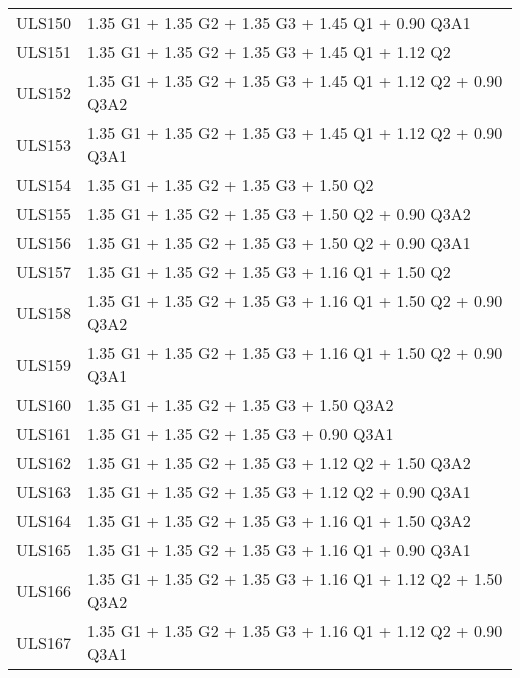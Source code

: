 \begin{center}
\begin{small}
\begin{longtable}{|l|p{10cm}|}
ULS150 & 1.35 G1 + 1.35 G2 + 1.35 G3 + 1.45 Q1 + 0.90 Q3A1\\
ULS151 & 1.35 G1 + 1.35 G2 + 1.35 G3 + 1.45 Q1 + 1.12 Q2\\
ULS152 & 1.35 G1 + 1.35 G2 + 1.35 G3 + 1.45 Q1 + 1.12 Q2 + 0.90 Q3A2\\
ULS153 & 1.35 G1 + 1.35 G2 + 1.35 G3 + 1.45 Q1 + 1.12 Q2 + 0.90 Q3A1\\
ULS154 & 1.35 G1 + 1.35 G2 + 1.35 G3 + 1.50 Q2\\
ULS155 & 1.35 G1 + 1.35 G2 + 1.35 G3 + 1.50 Q2 + 0.90 Q3A2\\
ULS156 & 1.35 G1 + 1.35 G2 + 1.35 G3 + 1.50 Q2 + 0.90 Q3A1\\
ULS157 & 1.35 G1 + 1.35 G2 + 1.35 G3 + 1.16 Q1 + 1.50 Q2\\
ULS158 & 1.35 G1 + 1.35 G2 + 1.35 G3 + 1.16 Q1 + 1.50 Q2 + 0.90 Q3A2\\
ULS159 & 1.35 G1 + 1.35 G2 + 1.35 G3 + 1.16 Q1 + 1.50 Q2 + 0.90 Q3A1\\
ULS160 & 1.35 G1 + 1.35 G2 + 1.35 G3 + 1.50 Q3A2\\
ULS161 & 1.35 G1 + 1.35 G2 + 1.35 G3 + 0.90 Q3A1\\
ULS162 & 1.35 G1 + 1.35 G2 + 1.35 G3 + 1.12 Q2 + 1.50 Q3A2\\
ULS163 & 1.35 G1 + 1.35 G2 + 1.35 G3 + 1.12 Q2 + 0.90 Q3A1\\
ULS164 & 1.35 G1 + 1.35 G2 + 1.35 G3 + 1.16 Q1 + 1.50 Q3A2\\
ULS165 & 1.35 G1 + 1.35 G2 + 1.35 G3 + 1.16 Q1 + 0.90 Q3A1\\
ULS166 & 1.35 G1 + 1.35 G2 + 1.35 G3 + 1.16 Q1 + 1.12 Q2 + 1.50 Q3A2\\
ULS167 & 1.35 G1 + 1.35 G2 + 1.35 G3 + 1.16 Q1 + 1.12 Q2 + 0.90 Q3A1\\
\hline
\end{longtable}
\end{small}
\end{center}
